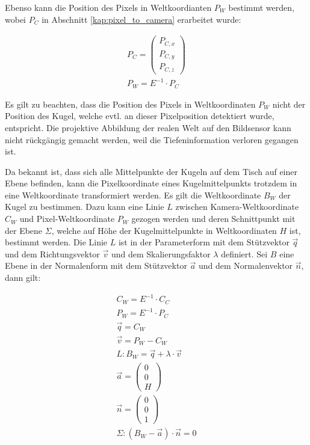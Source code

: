 Ebenso kann die Position des Pixels in Weltkoordianten $P_W$ bestimmt werden, wobei $P_C$
in Abschnitt \ref{kap:pixel_to_camera} erarbeitet wurde:

\begin{align}
P_C = \begin{pmatrix}P_{C,x}\\P_{C,y}\\P_{C,z}\end{pmatrix}\\
P_W = E^{-1} \cdot P_C
\end{align}

Es gilt zu beachten, dass die Position des Pixels in Weltkoordinaten $P_W$ nicht der Position des Kugel, welche evtl. an
dieser Pixelposition detektiert wurde, entspricht. Die projektive Abbildung der realen Welt auf den Bildsensor kann
nicht rückgängig gemacht werden, weil die Tiefeninformation verloren gegangen ist.

Da bekannt ist, dass sich alle Mittelpunkte der Kugeln auf dem Tisch auf einer Ebene befinden, kann die Pixelkoordinate
eines Kugelmittelpunkts trotzdem in eine Weltkoordinate transformiert werden.
Es gilt die Weltkoordinate $B_W$ der Kugel zu bestimmen.
Dazu kann eine Linie $L$ zwischen Kamera-Weltkoordinate $C_W$ und Pixel-Weltkoordinate $P_W$ gezogen werden und deren
Schnittpunkt mit der Ebene $\Sigma$, welche auf Höhe der Kugelmittelpunkte in Weltkoordinaten $H$ ist, bestimmt werden.
Die Linie $L$ ist in der Parameterform mit dem Stützvektor $\vec{q}$ und dem Richtungsvektor $\vec{v}$ und dem Skalierungsfaktor $\lambda$ definiert.
Sei $B$ eine Ebene in der Normalenform mit dem Stützvektor $\vec{a}$ und dem Normalenvektor $\vec{n}$, dann gilt:

\begin{align}
C_W = E^{-1} \cdot C_C\\
P_W = E^{-1} \cdot P_C\\
\vec{q} = C_W\\
\vec{v} = P_W - C_W\\
L: B_W = \vec{q} + \lambda \cdot \vec{v}\\
\vec{a} = \begin{pmatrix}0\\0\\H\end{pmatrix}\\
\vec{n} = \begin{pmatrix}0\\0\\1\end{pmatrix}\\
\Sigma: (B_W - \vec{a}) \cdot \vec{n} = 0\\
\end{align}

